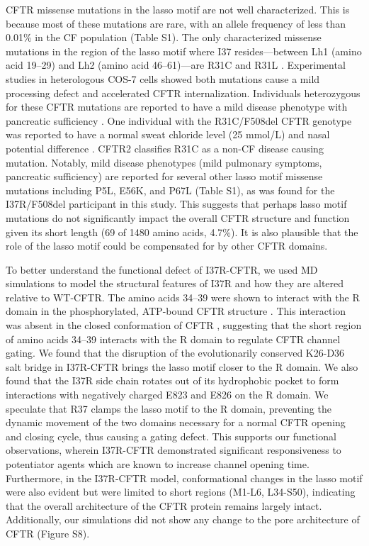 CFTR missense mutations in the lasso motif are not well characterized. This is because most of these mutations are rare, with an allele frequency of less than 0.01\% in the CF population (Table S1). The only characterized missense mutations in the region of the lasso motif where I37 resides—between Lh1 (amino acid 19–29) and Lh2 (amino acid 46–61)—are R31C and R31L \cite{cftr2, jurkuvenaite2006}. Experimental studies in heterologous COS-7 cells showed both mutations cause a mild processing defect and accelerated CFTR internalization. Individuals heterozygous for these CFTR mutations are reported to have a mild disease phenotype with pancreatic sufficiency \cite{jurkuvenaite2006}. One individual with the R31C/F508del CFTR genotype was reported to have a normal sweat chloride level (25 mmol/L) and nasal potential difference \cite{werlin2015}. CFTR2 classifies R31C as a non-CF disease causing mutation. Notably, mild disease phenotypes (mild pulmonary symptoms, pancreatic sufficiency) are reported for several other lasso motif missense mutations including P5L, E56K, and P67L (Table S1), as was found for the I37R/F508del participant in this study. This suggests that perhaps lasso motif mutations do not significantly impact the overall CFTR structure and function given its short length (69 of 1480 amino acids, 4.7\%). It is also plausible that the role of the lasso motif could be compensated for by other CFTR domains.

To better understand the functional defect of I37R-CFTR, we used MD simulations to model the structural features of I37R and how they are altered relative to WT-CFTR. The amino acids 34–39 were shown to interact with the R domain in the phosphorylated, ATP-bound CFTR structure \cite{zhang2018a}. This interaction was absent in the closed conformation of CFTR \cite{zhang2016}, suggesting that the short region of amino acids 34–39 interacts with the R domain to regulate CFTR channel gating. We found that the disruption of the evolutionarily conserved K26-D36 salt bridge in I37R-CFTR brings the lasso motif closer to the R domain. We also found that the I37R side chain rotates out of its hydrophobic pocket to form interactions with negatively charged E823 and E826 on the R domain. We speculate that R37 clamps the lasso motif to the R domain, preventing the dynamic movement of the two domains necessary for a normal CFTR opening and closing cycle, thus causing a gating defect. This supports our functional observations, wherein I37R-CFTR demonstrated significant responsiveness to potentiator agents which are known to increase channel opening time. Furthermore, in the I37R-CFTR model, conformational changes in the lasso motif were also evident but were limited to short regions (M1-L6, L34-S50), indicating that the overall architecture of the CFTR protein remains largely intact. Additionally, our simulations did not show any change to the pore architecture of CFTR (Figure S8).

